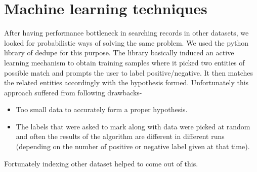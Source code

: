 \section{Machine learning techniques}

        After having performance bottleneck in searching records in other datasets, we looked for probabilistic ways of solving the same problem. We used the python library of dedupe \cite{dedupe} for this purpose. The library basically induced an active learning mechanism to obtain training samples where it picked two entities of possible match and prompts the user to label positive/negative. It then matches the related entities accordingly with the hypothesis formed. Unfortunately this approach suffered from following drawbacks-
        \begin{itemize}
        \item Too small data to accurately form a proper hypothesis. 
        \item The labels that were asked to mark along with data were picked at random and often the results of the algorithm are different in different runs (depending on the number of positive or negative label given at that time).
        \end{itemize}
        Fortunately indexing other dataset helped to come out of this.

